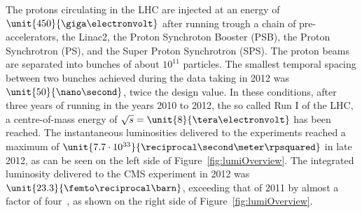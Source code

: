 The protons circulating in the LHC are injected at an energy of $\unit{450}{\giga\electronvolt}$ after running trough a chain of pre-accelerators, the Linac2, the Proton Synchroton Booster (PSB), the Proton Synchrotron (PS), and the Super Proton Synchrotron (SPS). The proton beams are separated into bunches of about $10^{11}$ particles. The smallest temporal spacing between two bunches achieved during the data taking in 2012 was $\unit{50}{\nano\second}$, twice the design value. In these conditions, after three years of running in the years 2010 to 2012, the so called Run I of the LHC, a centre-of-mass energy of $\sqrt{s} = \unit{8}{\tera\electronvolt}$ has been reached. The instantaneous luminosities delivered to the experiments reached a maximum of $\unit{7.7\cdot 10^{33}}{\reciprocal\second\meter\rpsquared}$ in late 2012, as can be seen on the left side of Figure~\ref{fig:lumiOverview}. The integrated luminosity delivered to the CMS experiment in 2012 was $\unit{23.3}{\femto\reciprocal\barn}$, exceeding that of 2011 by almost a factor of four~\cite{LumiTwiki}, as shown on the right side of Figure~\ref{fig:lumiOverview}. 

